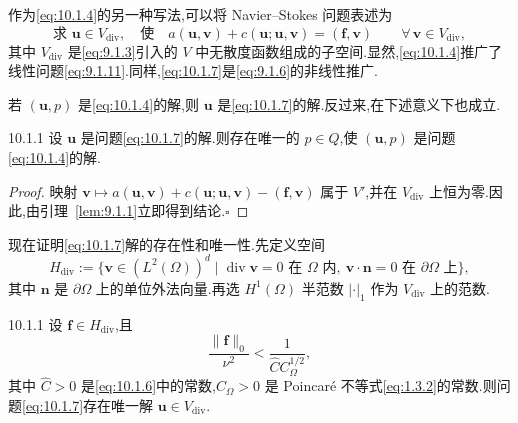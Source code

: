 作为\eqref{eq:10.1.4}的另一种写法,可以将 Navier--Stokes 问题表述为
\begin{equation}\label{eq:10.1.7}
  \text{求 }\boldsymbol{u}\in V_{\mathrm{div}},\quad\text{使}\quad
   a(\boldsymbol{u},\boldsymbol{v})+c(\boldsymbol{u};\boldsymbol{u},\boldsymbol{v})=(\boldsymbol{f},\boldsymbol{v})
      \qquad\forall\,\boldsymbol{v}\in V_{\mathrm{div}},
\end{equation}
其中 \(V_{\mathrm{div}}\) 是\eqref{eq:9.1.3}引入的 \(V\) 中无散度函数组成的子空间.显然,\eqref{eq:10.1.4}推广了线性问题\eqref{eq:9.1.11}.同样,\eqref{eq:10.1.7}是\eqref{eq:9.1.6}的非线性推广.

若 \((\boldsymbol{u},p)\) 是\eqref{eq:10.1.4}的解,则 \(\boldsymbol{u}\) 是\eqref{eq:10.1.7}的解.反过来,在下述意义下也成立.

\begin{lemma}[]{10.1.1}
设 \(\boldsymbol{u}\) 是问题\eqref{eq:10.1.7}的解.则存在唯一的 \(p\in Q\),使 \((\boldsymbol{u},p)\) 是问题\eqref{eq:10.1.4}的解.
\end{lemma}
\begin{proof}
映射 \(\boldsymbol{v}\mapsto a(\boldsymbol{u},\boldsymbol{v})+c(\boldsymbol{u};\boldsymbol{u},\boldsymbol{v})-(\boldsymbol{f},\boldsymbol{v})\) 属于 \(V'\),并在 \(V_{\mathrm{div}}\) 上恒为零.因此,由引理~\ref{lem:9.1.1}立即得到结论.\hfill\(\square\)
\end{proof}

现在证明\eqref{eq:10.1.7}解的存在性和唯一性.先定义空间
\begin{equation}\label{eq:10.1.8}
  H_{\mathrm{div}}:=\{\boldsymbol{v}\in(L^2(\Omega))^d\mid
   \operatorname{div}\boldsymbol{v}=0\text{ 在 }\Omega\text{ 内},\
   \boldsymbol{v}\cdot\boldsymbol{n}=0\text{ 在 }\partial\Omega\text{ 上}\},
\end{equation}
其中 \(\boldsymbol{n}\) 是 \(\partial\Omega\) 上的单位外法向量.再选 \(H^1(\Omega)\) 半范数 \(|\cdot|_1\) 作为 \(V_{\mathrm{div}}\) 上的范数.

\begin{theorem}[]{10.1.1}
设 \(\boldsymbol{f}\in H_{\mathrm{div}}\),且
\begin{equation}\label{eq:10.1.9}
  \frac{\|\boldsymbol{f}\|_0}{\nu^2}<\frac{1}{\widehat C C_\Omega^{1/2}},
\end{equation}
其中 \(\widehat C>0\) 是\eqref{eq:10.1.6}中的常数,\(C_\Omega>0\) 是 Poincaré 不等式\eqref{eq:1.3.2}的常数.则问题\eqref{eq:10.1.7}存在唯一解 \(\boldsymbol{u}\in V_{\mathrm{div}}\).
\end{theorem}

